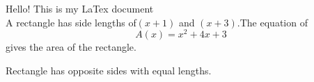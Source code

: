 \documentclass[12pt]{article}
\begin{document}
Hello! This is my LaTex document\\
A rectangle has side lengths of$(x+1)$ and $(x+3)$.The equation of $${A(x)=x^2+4x+3}$$ gives the area of the rectangle.



Rectangle has opposite sides with equal lengths.
\end{document}
